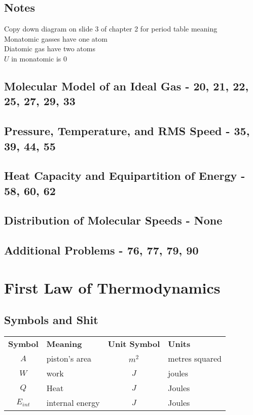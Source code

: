 \documentclass[12pt, letterpaper, twoside]{article}
\begin{document}
  \subsection*{Notes}
    Copy down diagram on slide 3 of chapter 2 for period table meaning\\
    Monatomic gasses have one atom\\
    Diatomic gas have two atoms\\
    $U$ in monatomic is 0\\
    
  
  \subsection{Molecular Model of an Ideal Gas - 20, 21, 22, 25, 27, 29, 33}
  
  \subsection{Pressure, Temperature, and RMS Speed - 35, 39, 44, 55}
  
  \subsection{Heat Capacity and Equipartition of Energy - 58, 60, 62}
  
  \subsection{Distribution of Molecular Speeds - None}
  
  \subsection*{Additional Problems - 76, 77, 79, 90}
  
  
\section{First Law of Thermodynamics}
  \subsection*{Symbols and Shit}
    \begin{tabular}{c l c l}
  	  \textbf{Symbol} & \textbf{Meaning} & \textbf{Unit Symbol} & \textbf{Units}\\
  	  $A$ & piston's area & $m^2$ & metres squared\\
  	  $W$ & work & $J$ & joules\\
  	  $Q$ & Heat & $J$ & Joules\\ 
  	  $E_{int}$ & internal energy & $J$ & Joules\\
  	  
    \end{tabular}
  
\end{document}
